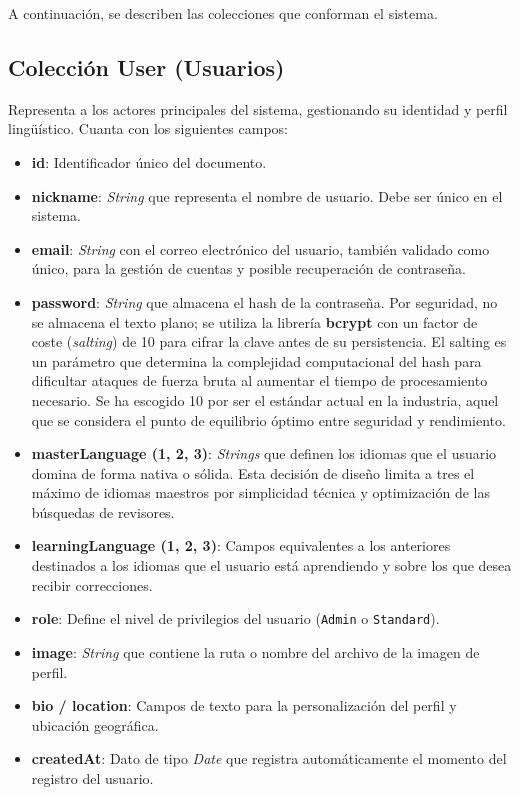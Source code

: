 A continuación, se describen las colecciones que conforman el sistema.


\subsection{Colección User (Usuarios)}
Representa a los actores principales del sistema, gestionando su identidad y perfil lingüístico. Cuanta con los siguientes campos:

\begin{itemize}
    \item \textbf{id}: Identificador único del documento.
    \item \textbf{nickname}: \textit{String} que representa el nombre de usuario. Debe ser único en el sistema.
    \item \textbf{email}: \textit{String} con el correo electrónico del usuario, también validado como único, para la gestión de cuentas y posible recuperación de contraseña.
    \item \textbf{password}: \textit{String} que almacena el hash de la contraseña. Por seguridad, no se almacena el texto plano; se utiliza la librería \textbf{bcrypt} con un factor de coste (\textit{salting}) de 10 para cifrar la clave antes de su persistencia. El salting es un parámetro que determina la complejidad computacional del hash para dificultar ataques de fuerza bruta al aumentar el tiempo de procesamiento necesario. Se ha escogido 10 por ser el estándar actual en la industria, aquel que se considera el punto de equilibrio óptimo entre seguridad y rendimiento.
    \item \textbf{masterLanguage (1, 2, 3)}: \textit{Strings} que definen los idiomas que el usuario domina de forma nativa o sólida. Esta decisión de diseño limita a tres el máximo de idiomas maestros por simplicidad técnica y optimización de las búsquedas de revisores.
    \item \textbf{learningLanguage (1, 2, 3)}: Campos equivalentes a los anteriores destinados a los idiomas que el usuario está aprendiendo y sobre los que desea recibir correcciones.
    \item \textbf{role}: Define el nivel de privilegios del usuario (\texttt{Admin} o \texttt{Standard}).
    \item \textbf{image}: \textit{String} que contiene la ruta o nombre del archivo de la imagen de perfil.
    \item \textbf{bio / location}: Campos de texto para la personalización del perfil y ubicación geográfica.
    \item \textbf{createdAt}: Dato de tipo \textit{Date} que registra automáticamente el momento del registro del usuario.
\end{itemize}

